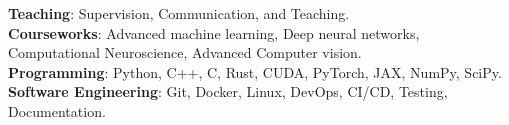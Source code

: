\documentclass[11pt, a4paper]{article}
\newcommand{\years}[1]{\marginnote{\scriptsize #1}}
\begin{document}
\textbf{Teaching}: Supervision, Communication, and Teaching. \\
\textbf{Courseworks}: Advanced machine learning, Deep neural networks, Computational Neuroscience, Advanced Computer vision. \\
\textbf{Programming}: Python, C++, C, Rust, CUDA, PyTorch, JAX, NumPy, SciPy. \\
\textbf{Software Engineering}: Git, Docker, Linux, DevOps, CI/CD, Testing, Documentation. \\

\begin{comment}
\section*{Technical training}

\years{2018}``The Brain Simulation Platform of the Human Brain
Project'', Human Brain Project summer school  --- \emph{Palermo, Italy}\\
\years{2018}``Transdisciplinary
Research Linking Neuroscience, Brain Medicine and Computer Science'', Human Brain Project
young researchers event ---
\emph{Ljubljana, Slovenia}\\
\years{2017}2\textsuperscript{nd} Young Researchers Event, Human Brain Project ---
\emph{Geneva, Switzerland}\\
\years{2014}AXEL course on particle accelerator physics --- \emph{CERN, Switzerland}

\section*{Voluntary work}
\years{2014-2016} Lecturer and tour guide for visitors in and around the CERN complex.
I was given in-depth introductions to the different parts of the
control system in the accelerator complex, the cryogenics
facilities and particle physics. \\
\years{2008-2015}Co-creator and lead programmer of the collaborative drawing-tool RepoCad, now published as open-source
(\href{https://github.com/selftiesoftware}{github.com/selftiesoftware}).

\section*{Languages}
\emph{Danish} (C2, native)\\
\emph{English} (C2, fully proficient)\\
\emph{French} (B1, working basic conversational) \\
\emph{German} (B1, working basic conversational)


\end{comment}
\end{document}
